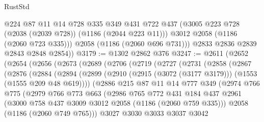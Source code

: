 \begin{lexlean}{RustStd}
\begin{coremodule}
            @224
            @87
            @11
            @14
            @728
            @335
            @349
            @431
            @722
            @437
            (@3005 @223 @728 (@2038 (@2039 @728)) (@1186 (@2044 @223 @11)))
            @3012
            @2058
            (@1186 (@2060 @723 @335)))
          @2058
          (@1186 (@2060 @696 @731)))
        @2833
        @2836
        @2839
        @2843
        @2848
        @2854))
@3179 := @1302 @2862 @376
@3247 := @2611
    (@2652
      (@2654
        (@2656
          (@2673
            (@2689
              (@2706
                (@2719
                  (@2727
                    (@2731
                      (@2858
                        (@2867
                          (@2876
                            (@2884
                              (@2894
                                (@2899
                                  (@2910
                                    (@2915 (@3072 (@3177 @3179)))
                                    (@1553 (@1555 @209 @48 @619))))
                                (@2886
                                  @215
                                  @87
                                  @11
                                  @14
                                  @777
                                  @349
                                  (@2974
                                    @766
                                    @775
                                    (@2979
                                      @766
                                      @773
                                      @663
                                      (@2986
                                        @765
                                        @772
                                        @431
                                        @184
                                        @437
                                        @2961
                                        (@3000
                                          @758
                                          @437
                                          @3009
                                          @3012
                                          @2058
                                          (@1186 (@2060 @759 @335)))
                                        @2058
                                        (@1186 (@2060 @749 @765)))
                                      @3027
                                      @3030
                                      @3033
                                      @3037
                                      @3042

\end{coremodule}
\end{lexlean}
